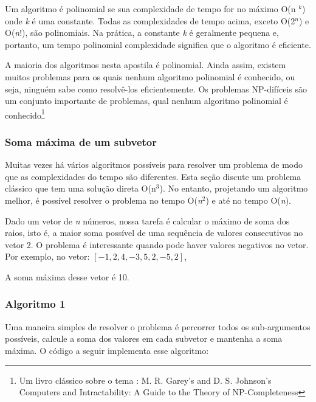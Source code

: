 Um algoritmo é polinomial se sua complexidade de tempo for no máximo O(n $^k$) onde \textit{k} é uma constante. Todas as complexidades de tempo acima, exceto O(2$^n$) e O(\textit{n}!), são polinomiais. Na prática, a constante \textit{k} é geralmente pequena e, portanto, um tempo polinomial complexidade significa que o algoritmo é eficiente. 

A maioria dos algoritmos nesta apostila é polinomial. Ainda assim, existem muitos problemas para os quais nenhum algoritmo polinomial é conhecido, ou seja, ninguém sabe como resolvê-los eficientemente. Os problemas NP-difíceis são um conjunto importante de problemas, qual nenhum algoritmo polinomial é conhecido\footnote{Um livro clássico sobre o tema : M. R. Garey’s and D. S. Johnson’s Computers and Intractability:
A Guide to the Theory of NP-Completeness}


\subsubsection{Soma máxima de um subvetor}
    
Muitas vezes há vários algoritmos possíveis para resolver um problema de modo que as complexidades do tempo são diferentes. Esta seção discute um problema clássico que tem uma solução direta O(n$^3$). No entanto, projetando um algoritmo melhor, é possível resolver o problema no tempo O(\textit{n}$^2$) e até no tempo O(\textit{n}).    

Dado um vetor de \textit{n} números, nossa tarefa é calcular o máximo de soma dos raios, isto é, a maior soma possível de uma sequência de valores consecutivos no vetor 2. O problema é interessante quando pode haver valores negativos no
vetor. Por exemplo, no vetor: $ [-1, 2, 4, -3, 5, 2, -5, 2]$,

A soma máxima desse vetor é 10.

\subsubsection{Algoritmo 1}

Uma maneira simples de resolver o problema é percorrer todos os sub-argumentos possíveis, calcule a soma dos valores em cada subvetor e mantenha a soma máxima. O código a seguir implementa esse algoritmo:



